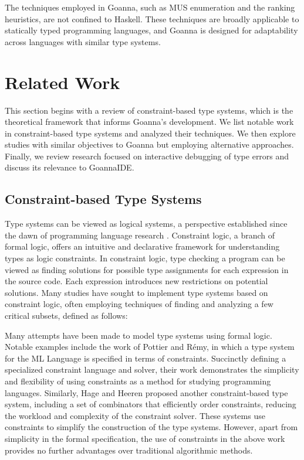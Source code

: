 \documentclass[pdflatex,lineno,sn-nature,Numbered]{sn-jnl}%
\begin{document}
The techniques employed in Goanna, such as MUS enumeration and the ranking heuristics, are not confined to Haskell. These techniques are broadly applicable to statically typed programming languages, and Goanna is designed for adaptability across languages with similar type systems.

\section{Related Work} 
    \label{sec:related-work}
This section begins with a review of constraint-based type systems, which is the theoretical framework that informs Goanna's development. We list notable work in constraint-based type systems and analyzed their techniques. We then explore studies with similar objectives to Goanna but employing alternative approaches. Finally, we review research focused on interactive debugging of type errors and discuss its relevance to GoannaIDE.

    \subsection{Constraint-based Type Systems}
    Type systems can be viewed as logical systems, a perspective established since the dawn of programming language research \cite{Reis_undated-lt}. Constraint logic, a branch of formal logic, offers an intuitive and declarative framework for understanding types as logic constraints. In constraint logic, type checking a program can be viewed as finding solutions for possible type assignments for each expression in the source code. Each expression introduces new restrictions on potential solutions. Many studies have sought to implement type systems based on constraint logic, often employing techniques of finding and analyzing a few critical subsets, defined as follows:

    Many attempts have been made to model type systems using formal logic. Notable examples include the work of Pottier and Rémy, in which a type system for the ML Language \cite{PottierUnknown-je} is specified in terms of constraints. Succinctly defining a specialized constraint language and solver, their work demonstrates the simplicity and flexibility of using constraints as a method for studying programming languages. Similarly, Hage and Heeren \cite{Hage2006-gc} proposed another constraint-based type system, including a set of combinators that efficiently order constraints, reducing the workload and complexity of the constraint solver. These systems use constraints to simplify the construction of the type systems. However, apart from simplicity in the formal specification, the use of constraints in the above work provides no further advantages over traditional algorithmic methods.
\end{document}
